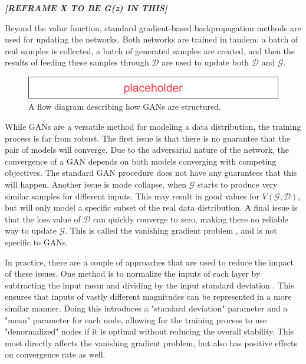 	\textit{\textbf{[REFRAME X TO BE G(z) IN THIS]}}
	\par Beyond the value function, standard gradient-based backpropagation methods are used for updating the networks. Both networks are trained in tandem: a batch of real samples is collected, a batch of generated samples are created, and then the results of feeding these samples through $\mathcal{D}$ are used to update both $\mathcal{D}$ and $\mathcal{G}$.  
	\begin{figure}
		\centering
		\caption{A flow diagram describing how GANs are structured.}
		\label{fig:GanFlowDiagram}
		\includegraphics[scale=0.5]{figures/Placeholder.png}
	\end{figure}
	\par While GANs are a versatile method for modeling a data distribution, the training process is far from robust. The first issue is that there is no guarantee that the pair of models will converge. Due to the adversarial nature of the network, the convergence of a GAN depends on both models converging with competing objectives. The standard GAN procedure does not have any guarantees that this will happen. Another issue is mode collapse, when $\mathcal{G}$ starts to produce very similar samples for different inputs. This may result in good values for $V(\mathcal{G},\mathcal{D})$, but will only model a specific subset of the real data distribution. A final issue is that the loss value of $\mathcal{D}$ can quickly converge to zero, making there no reliable way to update $\mathcal{G}$. This is called the vanishing gradient problem \cite{placeholderCitation}, and is not specific to GANs. 
	\par In practice, there are a couple of approaches that are used to reduce the impact of these issues. One method is to normalize the inputs of each layer by subtracting the input mean and dividing by the input standard deviation \cite{placeholderCitation}. This ensures that inputs of vastly different magnitudes can be represented in a more similar manner. Doing this introduces a "standard deviation" parameter and a "mean" parameter for each node, allowing for the training process to use "denormalized" nodes if it is optimal without reducing the overall stability. This most directly affects the vanishing gradient problem, but also has positive effects on convergence rate as well.

